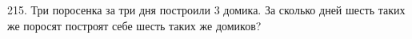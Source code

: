 215. Три поросенка за три дня построили 3 домика. За сколько дней шесть таких же поросят построят себе шесть таких же домиков?\\
